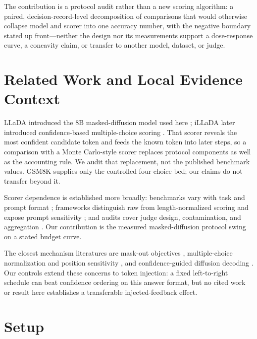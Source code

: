 \documentclass{article}
\begin{document}
The contribution is a protocol audit rather than a new scoring algorithm: a
paired, decision-record-level decomposition of comparisons that would otherwise collapse
model and scorer into one accuracy number, with the negative boundary stated
up front---neither the design nor its measurements support a dose-response
curve, a concavity claim, or transfer to another model, dataset, or judge.

\section{Related Work and Local Evidence Context}
\label{sec:related}

LLaDA introduced the 8B masked-diffusion model used here
\citep{nie2025llada}; iLLaDA later introduced confidence-based
multiple-choice scoring \citep{nie2026illada}.  That scorer reveals the most
confident candidate token and feeds the known token into later steps, so a
comparison with a Monte Carlo-style scorer replaces protocol components as
well as the accounting rule.  We audit that replacement, not the published
benchmark values.  GSM8K \citep{cobbe2021gsm8k} supplies only the controlled
four-choice bed; our claims do not transfer beyond it.

Scorer dependence is established more broadly: benchmarks vary with task and
prompt format \citep{brown2020fewshot,hendrycks2021mmlu,lin2022truthfulqa,chen2021codex};
frameworks distinguish raw from length-normalized scoring and expose prompt
sensitivity \citep{liang2023helm,biderman2024lessons,zhu2024promptrobust}; and
audits cover judge design, contamination, and aggregation
\citep{perez2022modelwritten,jain2024livecodebench,wang2023selfconsistency}.
Our contribution is the measured masked-diffusion protocol swing on a stated
budget curve.

The closest mechanism literatures are mask-out objectives
\citep{nie2025llada,nie2026illada,sahoo2024mdlm}, multiple-choice
normalization and position sensitivity \citep{holtzman2021surface,zheng2024selection},
and confidence-guided diffusion decoding \citep{nie2025llada}.  Our controls
extend these concerns to token injection: a fixed left-to-right schedule can
beat confidence ordering on this answer format, but no cited work or result
here establishes a transferable injected-feedback effect.

\section{Setup}
\label{sec:setup}
\end{document}
